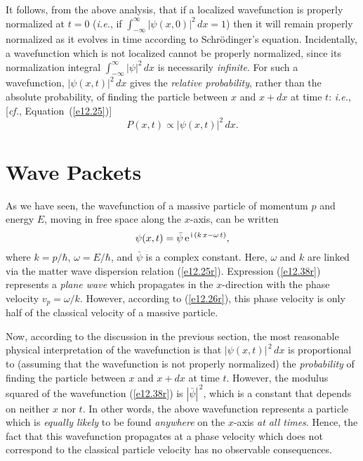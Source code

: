 It follows, from the above analysis, that if a localized wavefunction is properly normalized at $t=0$  ({\em i.e.}, if
$\int_{-\infty}^\infty |\psi(x,0)|^2\,dx =1$) then it will remain properly
normalized as it evolves in time according to Schr\"{o}dinger's equation. Incidentally,
a wavefunction which is not localized cannot be properly normalized, since its normalization integral $\int_{-\infty}^\infty|\psi|^2\,dx$
is necessarily {\em infinite}. For such a wavefunction, $|\psi(x,t)|^2\,dx$ gives the {\em relative probability}, rather than the
absolute probability, of finding the particle between $x$ and $x+dx$ at time $t$: {\em i.e.}, [{\em cf.}, Equation~(\ref{e12.25})]
\begin{equation}
P(x,t)\propto |\psi(x,t)|^2\,dx.
\end{equation}

\section{Wave Packets}
As we have seen, the wavefunction of a massive particle
of momentum $p$ and energy $E$, moving in free space  along the $x$-axis,  can be written
\begin{equation}\label{e12.38r}
\psi(x,t) = \bar{\psi}\,{\rm e}^{\,{\rm i}\,(k\,x-\omega\,t)},
\end{equation}
where $k= p/\hbar$, $\omega = E/\hbar$, and $\bar{\psi}$ is a complex constant. Here, $\omega$ and
$k$ are linked via the matter wave dispersion relation (\ref{e12.25r}). Expression (\ref{e12.38r}) represents a {\em plane wave}\/ which propagates in the $x$-direction
with the phase velocity $v_p=\omega/k$.  However, according to (\ref{e12.26r}), this phase velocity is only half of the classical velocity of a massive particle.

Now, according to the discussion in the previous section, the most reasonable physical interpretation of the wavefunction is that
$|\psi(x,t)|^{\,2}\,dx$ is proportional to (assuming that the wavefunction is not
properly normalized) the {\em probability}\/  of finding the particle
between $x$ and $x+dx$ at time $t$.  However, the modulus squared of the wavefunction (\ref{e12.38r}) is $|\bar{\psi}|^{\,2}$, which is a constant that depends on neither $x$ nor $t$. In other words, the above  wavefunction represents a particle
which is {\em equally likely}\/ to be found {\em anywhere}\/ on the $x$-axis {\em at all times}. 
Hence, the fact that this wavefunction propagates at 
a phase velocity which does not correspond to the classical particle velocity has no observable   consequences.


